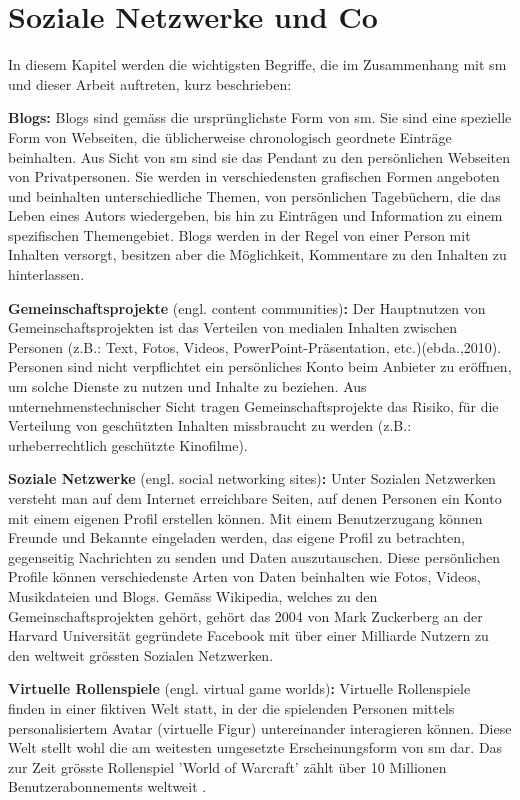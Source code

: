 \section{Soziale Netzwerke und Co}\label{sec.sn}
In diesem Kapitel werden die wichtigsten Begriffe, die im Zusammenhang mit \gls{sm} und dieser Arbeit auftreten, kurz beschrieben:\par  
\textbf{Blogs:} Blogs sind gemäss  die ursprünglichste Form von \gls{sm}. Sie sind eine spezielle Form von Webseiten, die üblicherweise chronologisch geordnete Einträge beinhalten. Aus Sicht von \gls{sm} sind sie das Pendant zu den persönlichen Webseiten von Privatpersonen. Sie werden in verschiedensten grafischen Formen angeboten und beinhalten unterschiedliche Themen, von persönlichen Tagebüchern, die das Leben eines Autors wiedergeben, bis hin zu Einträgen und Information zu einem spezifischen Themengebiet. Blogs werden in der Regel von einer Person mit Inhalten versorgt, besitzen aber die Möglichkeit, Kommentare zu den Inhalten zu hinterlassen. \par 
\textbf{Gemeinschaftsprojekte} (engl. content communities)\textbf{:} Der Hauptnutzen von Gemeinschaftsprojekten ist das Verteilen von medialen Inhalten zwischen Personen (z.B.: Text, Fotos, Videos, PowerPoint-Präsentation, etc.)(ebda.,2010). Personen sind nicht verpflichtet ein persönliches Konto beim Anbieter zu eröffnen, um solche Dienste zu nutzen und Inhalte zu beziehen. Aus unternehmenstechnischer Sicht tragen Gemeinschaftsprojekte das Risiko, für die Verteilung von geschützten Inhalten missbraucht zu werden (z.B.: urheberrechtlich geschützte Kinofilme). \par 
\textbf{Soziale Netzwerke} (engl. social networking sites)\textbf{:} Unter Sozialen Netzwerken versteht man auf dem Internet erreichbare Seiten, auf denen Personen ein Konto mit einem eigenen Profil erstellen können. Mit einem Benutzerzugang können Freunde und Bekannte eingeladen werden, das eigene Profil zu betrachten, gegenseitig Nachrichten zu senden und Daten auszutauschen. Diese persönlichen Profile können verschiedenste Arten von Daten beinhalten wie Fotos, Videos, Musikdateien und Blogs. Gemäss Wikipedia, welches zu den Gemeinschaftsprojekten gehört, gehört das 2004 von Mark Zuckerberg an der Harvard Universität gegründete Facebook mit über einer Milliarde Nutzern \cite{Facebook:2012} zu den weltweit grössten Sozialen Netzwerken.\par 
\textbf{Virtuelle Rollenspiele} (engl. virtual game worlds)\textbf{:} Virtuelle Rollenspiele finden in einer fiktiven Welt statt, in der die spielenden Personen mittels personalisiertem Avatar (virtuelle Figur) untereinander interagieren können. Diese Welt stellt wohl die am weitesten umgesetzte Erscheinungsform von \gls{sm} dar. Das zur Zeit grösste Rollenspiel 'World of Warcraft' zählt über 10 Millionen Benutzerabonnements weltweit \cite{Blizzard:2012}.\par 
